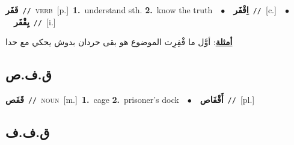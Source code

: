 \documentclass[10pt,a4paper,twoside]{article} %
\begin{document}
\begin{multicols}{2}
{\setlength\topsep{0pt}\textbf{\foreignlanguage{arabic}{قَفَر}}\ {\color{gray}\texttt{//}\color{black}}\ \textsc{verb}\ [p.]\ \textbf{1.}~understand sth.  \textbf{2.}~know the truth\ \ $\bullet$\ \ \setlength\topsep{0pt}\textbf{\foreignlanguage{arabic}{اِقْفَر}}\ {\color{gray}\texttt{//}\color{black}}\ [c.]\ \ $\bullet$\ \ \setlength\topsep{0pt}\textbf{\foreignlanguage{arabic}{يِقْفَر}}\ {\color{gray}\texttt{//}\color{black}}\ [i.]\  \begin{flushright}\color{gray}\foreignlanguage{arabic}{\textbf{\underline{\foreignlanguage{arabic}{أمثلة}}}: أوَّل ما قْفِرِت الموضوع هو بقى حردان بدوش يحكي مع حدا}\end{flushright}\color{black}} \vspace{2mm}

\vspace{-3mm}
\subsection*{\color{blue}\foreignlanguage{arabic}{ق.ف.ص}\color{blue}{}} 

{\setlength\topsep{0pt}\textbf{\foreignlanguage{arabic}{قَفَص}}\ {\color{gray}\texttt{//}\color{black}}\ \textsc{noun}\ [m.]\ \textbf{1.}~cage  \textbf{2.}~prisoner's dock\ \ $\bullet$\ \ \setlength\topsep{0pt}\textbf{\foreignlanguage{arabic}{أَقْفَاص}}\ {\color{gray}\texttt{//}\color{black}}\ [pl.]\ } \vspace{2mm}

\vspace{-3mm}
\subsection*{\color{blue}\foreignlanguage{arabic}{ق.ف.ف}\color{blue}{}} 


\end{multicols}
\end{document}
